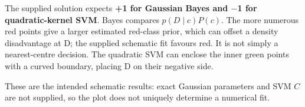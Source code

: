 The supplied solution expects \textbf{+1 for Gaussian Bayes and \ensuremath{-}1 for quadratic-kernel SVM}. Bayes compares \(p(D\mid c)P(c)\). The more numerous red points give a larger estimated red-class prior, which can offset a density disadvantage at D; the supplied schematic fit favours red. It is not simply a nearest-centre decision. The quadratic SVM can enclose the inner green points with a curved boundary, placing D on their negative side.


These are the intended schematic results: exact Gaussian parameters and SVM \(C\) are not supplied, so the plot does not uniquely determine a numerical fit.

